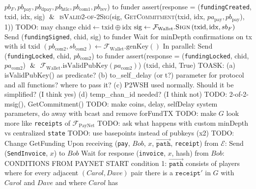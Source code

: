 \begin{algorithmic}[1]
      \Indent
        \Indent
          \State $pb_F, pb_{\mathrm{pay}}, pb_{\mathrm{dpay}},
          pb_{\mathrm{htlc}}, pb_{\mathrm{com}1}, pb_{\mathrm{rev}}$) to funder
        \EndIndent
      \EndIndent
      \State assert(response = (\texttt{fundingCreated}, txid, idx, sig) $\And$
      \textsc{isValid2-of-2Sig}(sig, \textsc{GetCommitment}(txid, idx,
      $pa_{\mathrm{pay}}, pb_{\mathrm{pay}}$), 1)) TODO: may change
      \State $\mathrm{chid} \gets \mathrm{txid} \oplus \mathrm{idx}$
      \State $\mathrm{sig} \gets
      \mathcal{F}_{\mathrm{Wallet}}.\textsc{Sign}\left(\mathrm{txid},
      \mathrm{idx}, sb_F\right)$
      \State Send (\texttt{fundingSigned}, chid, sig) to funder
      \State Wait for minDepth confirmations on tx with id txid
      \State $\left(pb_{\mathrm{com}2}, sb_{\mathrm{com}2}\right) \gets
      \mathcal{F}_{\mathrm{Wallet}}.\mathrm{genKey}\left(\right)$
      \State In parallel:
      \Indent
        \State Send (\texttt{fundingLocked}, chid, $pb_{\mathrm{com}2}$) to
        funder
        \State assert(response = (\texttt{fundingLocked}, chid,
        $pa_{\mathrm{com}2}$) $\And$
        \Indent
          \State $\mathcal{F}_{\mathrm{Wallet}}.\mathrm{isValidPubKey}
          \left(pa_{\mathrm{com}2}\right)$)
        \EndIndent
      \EndIndent
      \State \Return (txid, chid, True)
    \EndFunction
    \State
    \State TOASK: (a) isValidPubKey() as predicate? (b) to\_self\_delay (or t?)
    parameter for protocol and all functions? where to pass it? (c) P2WSH used
    normally. Should it be simplified? (I think yes) (d) temp\_chan\_id needed?
    (I think not)
    \State TODO: 2-of-2-msig(), GetCommitment()
    \State TODO: make coins, delay, selfDelay system parameters, do away with
    bcast and remove forFundTX
    \State TODO: make $G$ look more like \texttt{receipts} of
    $\mathcal{F}_{\mathrm{PayNet}}$
    \State TODO: ask what happens with custom minDepth vs centralized
    \texttt{state}
    \State TODO: use basepoints instead of pubkeys (x2)
    \State TODO: Change GetFunding
    \State
    \State Upon receiving (\texttt{pay}, $Bob$, $x$,
    $\overrightarrow{\mathtt{path}}$, \texttt{receipt}) from $\mathcal{E}$:
      \State Send (\texttt{SendInvoice}, $x$) to $Bob$
      \State Wait for response (\texttt{invoice}, $x$, hash) from $Bob$:
      \Indent
        \State CONDITIONS FROM PAYNET START
        \State condition 1: $\overrightarrow{\mathtt{path}}$ consists of players
        where for every adjacent $\left(Carol, Dave\right)$ pair there is a
        $\mathtt{receipt}'$ in $G$ with $Carol$ and $Dave$ and where $Carol$ has

\end{algorithmic}

